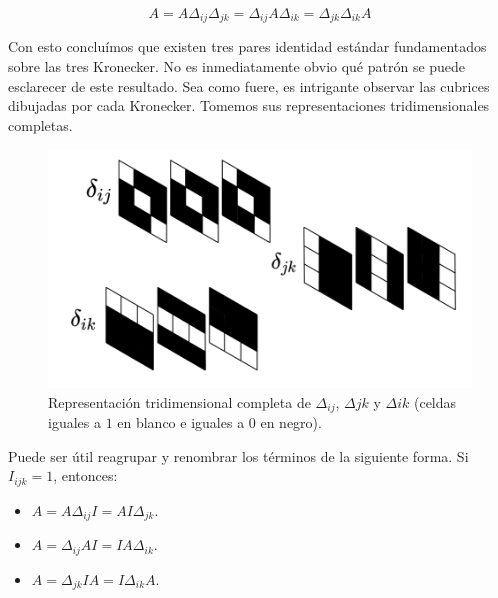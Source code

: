 $$A = A \Delta_{ij} \Delta_{jk} = \Delta_{ij} A \Delta_{ik} = \Delta_{jk} \Delta_{ik} A$$

\newpage

Con esto concluímos que existen tres pares identidad estándar fundamentados sobre las tres Kronecker. No es inmediatamente obvio qué patrón se puede esclarecer de este resultado. Sea como fuere, es intrigante observar las cubrices dibujadas por cada Kronecker. Tomemos sus representaciones tridimensionales completas.

\begin{figure}[H]
	\includegraphics[width=\linewidth]{media/kroneckers.png}
	\caption{Representación tridimensional completa de $\Delta_{ij}$, $\Delta{jk}$ y $\Delta{ik}$ (celdas iguales a $1$ en blanco e iguales a $0$ en negro).}
\end{figure}

Puede ser útil reagrupar y renombrar los términos de la siguiente forma. Si $I_{ijk} = 1$, entonces:

\begin{itemize}
	\item $A = A \Delta_{ij} I = A I \Delta_{jk}$.
	\item $A = \Delta_{ij} A I = I A \Delta_{ik}$.
	\item $A = \Delta_{jk} I A = I \Delta_{ik} A$.
\end{itemize}

\newpage
